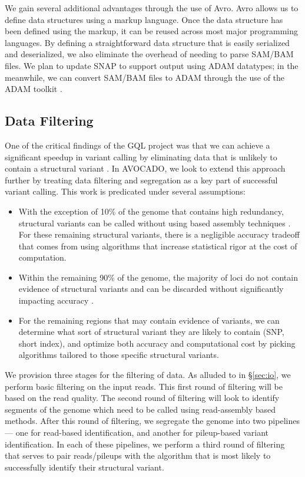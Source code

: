 \documentclass[11pt]{article}
\begin{document}
We gain several additional advantages through the use of Avro. Avro allows us to define data structures using a markup
language. Once the data structure has been defined using the markup, it can be reused across most major programming
languages. By defining a straightforward data structure that is easily serialized and deserialized, we also eliminate the overhead
of needing to parse SAM/BAM files. We plan to update SNAP to support output using ADAM datatypes; in the meanwhile,
we can convert SAM/BAM files to ADAM through the use of the ADAM toolkit \cite{adam}.

\subsection{Data Filtering}
\label{sec:data-filtering}

One of the critical findings of the GQL project was that we can achieve a significant speedup in variant calling by eliminating
data that is unlikely to contain a structural variant \cite{kozanitis13}. In AVOCADO, we look to extend this approach further by treating
data filtering and segregation as a key part of successful variant calling. This work is predicated under several assumptions:

\begin{itemize}
\item With the exception of 10\% of the genome that contains high redundancy, structural variants can be called without
using based assembly techniques \cite{xia09}. For these remaining structural variants, there is a negligible accuracy
tradeoff that comes from using algorithms that increase statistical rigor at the cost of computation.
\item Within the remaining 90\% of the genome, the majority of loci do not contain evidence of structural variants and
can be discarded without significantly impacting accuracy \cite{kozanitis13}.
\item For the remaining regions that may contain evidence of variants, we can determine what sort of structural variant they
are likely to contain (SNP, short index), and optimize both accuracy and computational cost by picking algorithms tailored
to those specific structural variants.
\end{itemize}

We provision three stages for the filtering of data. As alluded to in \S\ref{sec:io}, we perform basic filtering on the input reads.
This first round of filtering will be based on the read quality. The second round of filtering will look to identify segments of the
genome which need to be called using read-assembly based methods. After this round of filtering, we segregate the genome
into two pipelines --- one for read-based identification, and another for pileup-based variant identification. In each of these
pipelines, we perform a third round of filtering that serves to pair reads/pileups with the algorithm that is most likely to successfully
identify their structural variant.
\end{document}
